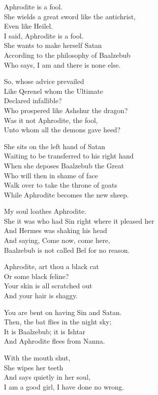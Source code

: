 \documentclass[
]{book}
\begin{document}
Aphrodite is a fool.\\
She wields a great sword like the antichrist,\\
Even like Heilel.\\
I said, Aphrodite is a fool.\\
She wants to make herself Satan\\
According to the philosophy of Baalzebub\\
Who says, I am and there is none else.

So, whose advice prevailed\\
Like Qerenel whom the Ultimate\\
Declared infallible?\\
Who prospered like Ashshur the dragon?\\
Was it not Aphrodite, the fool,\\
Unto whom all the demons gave heed?

She sits on the left hand of Satan\\
Waiting to be transferred to his right hand\\
When she deposes Baalzebub the Great\\
Who will then in shame of face\\
Walk over to take the throne of goats\\
While Aphrodite becomes the new sheep.

My soul loathes Aphrodite.\\
She it was who had Sin right where it pleased her\\
And Hermes was shaking his head\\
And saying, Come now, come here,\\
Baalzebub is not called Bel for no reason.

Aphrodite, art thou a black cat\\
Or some black feline?\\
Your skin is all scratched out\\
And your hair is shaggy.

You are bent on having Sin and Satan.\\
Then, the bat flies in the night sky;\\
It is Baalzebub; it is Ishtar\\
And Aphrodite flees from Nanna.

With the mouth shut,\\
She wipes her teeth\\
And says quietly in her soul,\\
I am a good girl, I have done no wrong.
\end{document}
